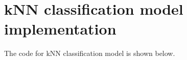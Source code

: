 
\chapter{kNN classification model implementation}
The code for kNN classification model is shown below.\\


